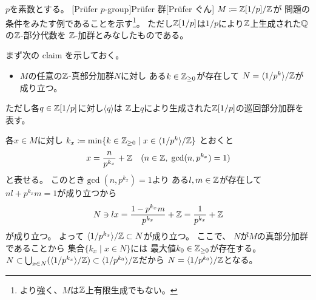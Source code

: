 \documentclass[report]{jlreq}
\begin{document}
\begin{answer}
    $p$を素数とする。
    [Pr\"{u}fer $p$-group]{Pr\"{u}fer 群}[Pr\"{u}fer ぐん]
    $M \coloneqq \mathbb{Z}[1/p] / \mathbb{Z}$が
    問題の条件をみたす例であることを示す\footnote{
        より強く、$M$は$\mathbb{Z}$上有限生成でもない。
    }。
    ただし$\mathbb{Z}[1/p]$は$1/p$により$\mathbb{Z}$上生成された$\mathbb{Q}$の$\mathbb{Z}$-部分代数を
    $\mathbb{Z}$-加群とみなしたものである。

    まず次の claim を示しておく。
    \begin{itemize}
        \item $M$の任意の$\mathbb{Z}$-真部分加群$N$に対し
            ある$k \in \mathbb{Z}_{\ge 0}$が存在して
            $N = \langle 1/p^k \rangle / \mathbb{Z}$が成り立つ。
    \end{itemize}
    ただし各$q \in \mathbb{Z}[1/p]$に対し$\langle q \rangle$は
    $\mathbb{Z}$上$q$により生成された$\mathbb{Z}[1/p]$の巡回部分加群を表す。
    \begin{innerproof}
        各$x \in M$に対し
        $k_x \coloneqq \min\{
                k \in \mathbb{Z}_{\ge 0}
                \mid
                x \in \langle 1/p^k \rangle / \mathbb{Z}
            \}$
        とおくと
        \begin{equation}
            x = \frac{n}{p^{k_x}} + \mathbb{Z}
            \quad
            (n \in \mathbb{Z}, \; \gcd(n, p^{k_x}) = 1)
        \end{equation}
        と表せる。
        このとき$\gcd(n, p^{k_x}) = 1$より
        ある$l, m \in \mathbb{Z}$が存在して
        $nl + p^{k_x}m = 1$が成り立つから
        \begin{equation}
            N \ni lx = \frac{1 - p^{k_x}m}{p^{k_x}} + \mathbb{Z}
                = \frac{1}{p^{k_x}} + \mathbb{Z}
        \end{equation}
        が成り立つ。
        よって
        $\langle 1/p^{k_x} \rangle / \mathbb{Z} \subset N$が成り立つ。
        ここで、
        $N$が$M$の真部分加群であることから
        集合$\{ k_x \mid x \in N \}$には
        最大値$k_0 \in \mathbb{Z}_{\ge 0}$が存在する。
        $N \subset \bigcup_{x \in N} (\langle 1/p^{k_x} \rangle / \mathbb{Z})
            \subset \langle 1/p^{k_0} \rangle / \mathbb{Z}$だから
        $N = \langle 1/p^{k_0} \rangle / \mathbb{Z}$となる。
    \end{innerproof}


\end{answer}
\end{document}
